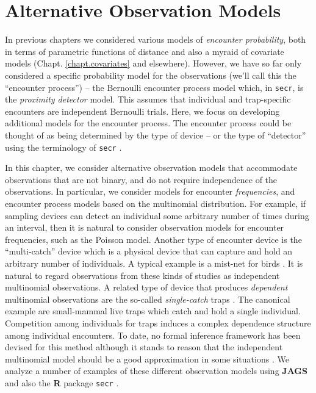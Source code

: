 \chapter{Alternative Observation Models}
\label{chapt.poisson-mn}

\vspace{.3in}



In previous chapters we considered 
various models of {\it encounter probability}, both in terms of
parametric functions of distance and also a myraid of covariate
models (Chapt. \ref{chapt.covariates} and
elsewhere).
However, we have so far only considered
a specific probability model for the observations (we'll call this the
``encounter process'') --
the Bernoulli encounter process model which, in \mbox{\tt secr}, is
the {\it proximity detector} model. This assumes that individual and
trap-specific encounters are independent Bernoulli trials.  Here, we
focus on developing additional models for the encounter process.  The
encounter process could be thought of as being determined by the type
of device -- or the type of ``detector'' using the terminology of
\mbox{\tt secr} \citep{efford:2011}.

In this chapter, we consider alternative observation models 
 that accommodate observations that are not binary, and do not
require independence of the observations. 
In particular, we consider models for
encounter {\it frequencies}, and encounter process models based on the
multinomial distribution. For example, if sampling devices can detect
an individual some arbitrary number of times during an interval, then
it is natural to consider observation models for encounter
frequencies, such as the Poisson model. Another type of encounter
device is the ``multi-catch'' device \citep{efford_etal:2009euring}
which is a physical device that can capture and hold an arbitrary
number of individuals. A typical example is a mist-net for birds
\citep{borchers_efford:2008}.  It is natural to regard observations
from these kinds of studies as independent multinomial observations.
A related type of device that produces {\it dependent} multinomial
observations are the so-called {\it single-catch} traps
\citep{efford:2004, efford_etal:2009euring}. The canonical example are
small-mammal live traps  which catch and
hold a single individual. Competition among individuals for traps
induces a complex dependence structure among individual encounters. To
date, no formal inference framework has been devised for this method
although it stands to reason that the independent multinomial model
should be a good approximation in some situations
\citep{efford_etal:2009euring}.
We analyze a number of examples of these different observation models
using {\bf JAGS} and also the {\bf R}
package \mbox{\tt secr} \citep{efford:2011}.





